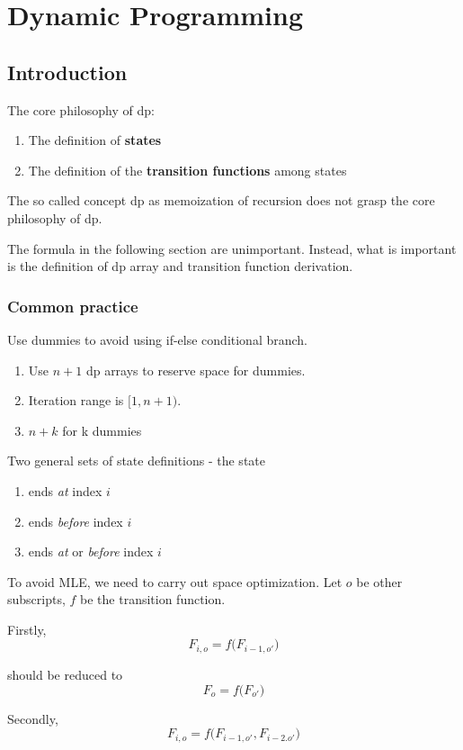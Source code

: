 \chapter{Dynamic Programming}



\section{Introduction}
The core philosophy of dp:
\begin{enumerate}
\item The definition of \textbf{states} 
\item The definition of the \textbf{transition functions} among states 
\end{enumerate} 

The so called concept dp as memoization of recursion does not grasp the core philosophy of dp. 

The formula in the following section are unimportant. Instead, what is important is the definition of dp array and transition function derivation.
\subsection{Common practice}
 Use dummies to avoid using if-else conditional branch.
\begin{enumerate}
\item Use $n+1$ dp arrays to reserve space for dummies. 
\item Iteration range is $[1, n+1)$.
\item $n+k$ for k dummies  
\end{enumerate}
 Two general sets of state definitions - the state 
\begin{enumerate}
\item ends \textit{at} index $i$
\item ends \textit{before} index $i$
\item ends \textit{at} or \textit{before} index $i$
\end{enumerate}

 To avoid MLE, we need to carry out space optimization. Let $o$ be other subscripts, $f$ be the transition function. 

Firstly,
$$
F_{i, o} = f\big(F_{i-1, o'}\big)
$$

should be reduced to 
$$
F_{o} = f\big(F_{o'}\big)
$$

Secondly,
$$
F_{i, o} = f\big(F_{i-1, o'}, F_{i-2. o'}\big)
$$

